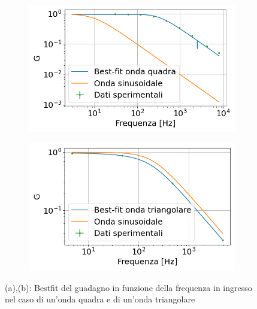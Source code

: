 \documentclass{article}
\begin{document}
        \begin{figure}[htbp]
            \centering
            \begin{subfigure}{0.45\textwidth} %
                \centering
                \includegraphics[width=\textwidth]{gain_squarewave.png} %
                \caption{}
                \label{fig:image1}
            \end{subfigure}
            \hfill %
            \begin{subfigure}{0.45\textwidth} %
                \centering
                \includegraphics[width=\textwidth]{gain_trianwave.png} %
                \caption{}
                \label{fig:image2}
            \end{subfigure}
            \caption{(a),(b): Bestfit del guadagno in funzione della frequenza in ingresso nel caso di un'onda quadra e di un'onda triangolare}
            \label{fig:side_by_side_images}
        \end{figure}
\end{document}
